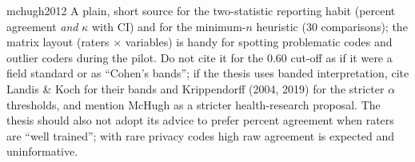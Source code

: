 \begin{papercard}{mchugh2012}
 A plain, short source for the two-statistic reporting habit (percent agreement \emph{and} $\kappa$ with CI) and for the minimum-$n$ heuristic (30 comparisons); the matrix layout (raters $\times$ variables) is handy for spotting problematic codes and outlier coders during the pilot. Do not cite it for the 0.60 cut-off as if it were a field standard or as ``Cohen's bands''; if the thesis uses banded interpretation, cite Landis \& Koch for their bands and Krippendorff (2004, 2019) for the stricter $\alpha$ thresholds, and mention McHugh as a stricter health-research proposal. The thesis should also not adopt its advice to prefer percent agreement when raters are ``well trained''; with rare privacy codes high raw agreement is expected and uninformative.
\end{papercard}
